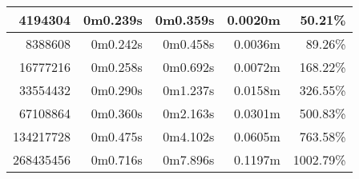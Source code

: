 \documentclass[documentation.tex]{subfiles}
\begin{document}
\begin{longtable}{|r|r|r|r|r|}
        4194304                                                                                                                   & 0m0.239s                        & 0m0.359s                                                                    & {\color[HTML]{32CB00} 0.0020m}                    & {\color[HTML]{32CB00} 50.21\%}                    \\ \hline
        8388608                                                                                                                   & 0m0.242s                        & 0m0.458s                                                                    & {\color[HTML]{32CB00} 0.0036m}                    & {\color[HTML]{32CB00} 89.26\%}                    \\ \hline
        16777216                                                                                                                  & 0m0.258s                        & 0m0.692s                                                                    & {\color[HTML]{32CB00} 0.0072m}                    & {\color[HTML]{32CB00} 168.22\%}                   \\ \hline
        33554432                                                                                                                  & 0m0.290s                        & 0m1.237s                                                                    & {\color[HTML]{32CB00} 0.0158m}                    & {\color[HTML]{32CB00} 326.55\%}                   \\ \hline
        67108864                                                                                                                  & 0m0.360s                        & 0m2.163s                                                                    & {\color[HTML]{32CB00} 0.0301m}                    & {\color[HTML]{32CB00} 500.83\%}                   \\ \hline
        134217728                                                                                                                 & 0m0.475s                        & 0m4.102s                                                                    & {\color[HTML]{32CB00} 0.0605m}                    & {\color[HTML]{32CB00} 763.58\%}                   \\ \hline
        268435456                                                                                                                 & 0m0.716s                        & 0m7.896s                                                                    & {\color[HTML]{32CB00} 0.1197m}                    & {\color[HTML]{32CB00} 1002.79\%}                  \\ \hline

\end{longtable}
\end{document}
